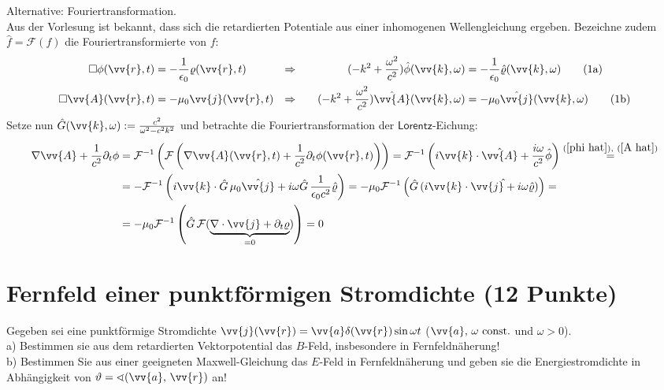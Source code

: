\documentclass[a4paper,12pt]{article}
\begin{document}
Alternative: Fouriertransformation.\\
Aus der Vorlesung ist bekannt, dass sich die retardierten Potentiale aus einer inhomogenen Wellengleichung ergeben. Bezeichne zudem $\hat{f}=\mathcal{F}(f)$ die Fouriertransformierte von $f$:
\begin{align*}
\Box \phi(\vv{r},t)&=-\frac{1}{\epsilon_0}\varrho(\vv{r},t) &\Rightarrow &\ \ \ &(-k^2+\frac{\omega^2}{c^2})\hat{\phi}(\vv{k},\omega)&=-\frac{1}{\epsilon_0}\hat{\varrho}(\vv{k},\omega) \label{phi hat}\tag{1a}\\
\Box \vv{A}(\vv{r},t)&=-\mu_0\vv{j}(\vv{r},t)&\Rightarrow &\ \ \ &(-k^2+\frac{\omega^2}{c^2})\hat{\vv{A}}(\vv{k},\omega)&=-\mu_0\hat{\vv{j}}(\vv{k},\omega) \label{A hat}\tag{1b}
\end{align*}
Setze nun $\hat{G}(\vv{k},\omega):=\frac{c^2}{\omega^2-c^2k^2}$ und betrachte die Fouriertransformation der $\mathsf{Lorentz}$-Eichung:
\begin{align*}
\nabla\vv{A}+\frac{1}{c^2}\partial_t\phi&=\mathcal{F}^{-1}\left(\mathcal{F}\left(\nabla\vv{A}(\vv{r},t)+\frac{1}{c^2}\partial_t\phi(\vv{r},t)\right)\right)=\mathcal{F}^{-1}\left(i\vv{k}\cdot\hat{\vv{A}}+\frac{i\omega}{c^2}\hat{\phi}\right)\overset{(\ref{phi hat}),\ (\ref{A hat})}{=} \\
&=-\mathcal{F}^{-1}\left(i\vv{k}\cdot \hat{G}\,\mu_0\hat{\vv{j}}+i\omega\hat{G}\,\frac{1}{\epsilon_0 c^2}\hat{\varrho}\right)=-\mu_0\mathcal{F}^{-1}\left(\hat{G}\,(i\vv{k}\cdot\hat{\vv{j}+i\omega\hat\varrho})\right)=\\
&=-\mu_0\mathcal{F}^{-1}\left(\hat{G}\, \mathcal{F}(\underbrace{\nabla\cdot\vv{j}+\partial_t\varrho}_{=0})\right)=0
\end{align*}
\section{Fernfeld einer punktförmigen Stromdichte (12 Punkte)}
Gegeben sei eine punktförmige Stromdichte $\vv{j}(\vv{r})=\vv{a}\delta (\vv{r})\sin\omega t$ ($\vv{a},\,\omega\ \textrm{const.}$ und $\omega >0$). \\
a) Bestimmen sie aus dem retardierten Vektorpotential das $B$-Feld, insbesondere in Fernfeldnäherung! \\
b) Bestimmen Sie aus einer geeigneten Maxwell-Gleichung das $E$-Feld in Fernfeldnäherung und geben sie die Energiestromdichte in Abhängigkeit von $\vartheta=\sphericalangle (\vv{a},\,\vv{r}) $ an!
\end{document}
